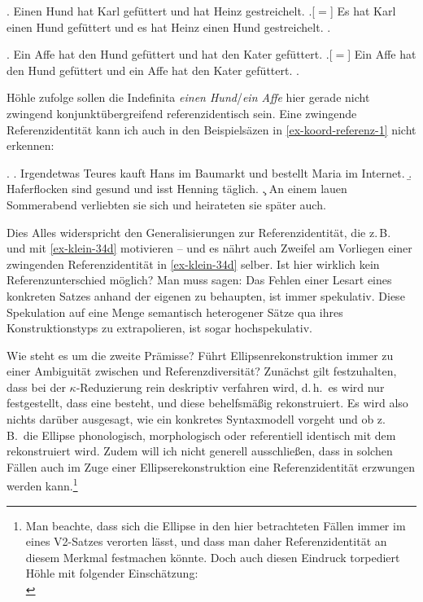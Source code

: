 \ex. \label{ex-hoehle91-122}Einen Hund hat Karl gefüttert und hat Heinz gestreichelt. 
\a.[$=$] Es hat Karl einen Hund gefüttert und es hat Heinz einen Hund gestreichelt. 
\z. \citep[(122-a), (123)]{Hoehle:91} 

\ex. \label{ex-hoehle91-125}Ein Affe hat den Hund gefüttert und hat den Kater gefüttert.
\a.[$=$] Ein Affe hat den Hund gefüttert und ein Affe hat den Kater gefüttert.
\z. \citep[(125), (126)]{Hoehle:91}

Höhle zufolge sollen die Indefinita {\it einen Hund}/{\it ein Affe} hier gerade nicht zwingend konjunktübergreifend referenzidentisch sein. Eine zwingende Referenzidentität kann ich auch in den Beispielsäzen in \ref{ex-koord-referenz-1} nicht erkennen:

\ex. \label{ex-koord-referenz-1}
\a. Irgendetwas Teures kauft Hans im Baumarkt und bestellt Maria im Internet.
\b. Haferflocken sind gesund und isst Henning täglich.
\c. An einem lauen Sommerabend verliebten sie sich und heirateten sie später auch.
 
Dies Alles widerspricht den Generalisierungen zur Referenzidentität, die z.\,B.\  \cite{Klein:93} und \cite{Reich:09} mit \ref{ex-klein-34d} motivieren -- und es nährt auch Zweifel am Vorliegen einer zwingenden Referenzidentität in \ref{ex-klein-34d} selber. Ist hier wirklich kein Referenzunterschied möglich? Man muss sagen: Das Fehlen einer Lesart eines konkreten Satzes anhand der eigenen  zu behaupten, ist immer spekulativ. Diese Spekulation auf eine Menge semantisch heterogener Sätze qua ihres Konstruktionstyps zu extrapolieren, ist sogar hochspekulativ. 

Wie steht es um die zweite Prämisse? Führt Ellipsenrekonstruktion immer zu einer Ambiguität zwischen  und Referenzdiversität? Zunächst gilt festzuhalten, dass bei der $\kappa$-Reduzierung rein deskriptiv verfahren wird, d.\,h.\ es wird nur festgestellt, dass eine  besteht, und diese behelfsmä\ss ig rekonstruiert. Es wird also nichts darüber ausgesagt, wie ein konkretes Syntaxmodell vorgeht und ob z.\,B.\  die Ellipse phonologisch, morphologisch oder referentiell identisch mit dem  rekonstruiert wird. Zudem will ich nicht generell ausschlie\ss en, dass in solchen Fällen auch im Zuge einer Ellipserekonstruktion eine Referenzidentität erzwungen werden kann.\footnote{Man beachte, dass sich die Ellipse in den hier betrachteten Fällen immer im  eines V2-Satzes verorten lässt, und dass man daher Referenzidentität an diesem Merkmal festmachen könnte. Doch auch diesen Eindruck torpediert Höhle mit folgender Einschätzung:\\ 
}

